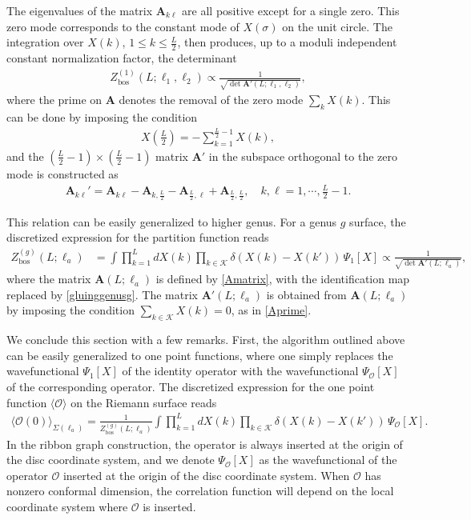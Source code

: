 \documentclass[12pt]{article}
\def\ie{\begin{equation}\begin{aligned}}
\def\fe{\end{aligned}\end{equation}}
\numberwithin{equation}{section}
\begin{document}
The eigenvalues of the matrix $\mathbf{A}_{k\ell}$ are all positive except for a single zero. This zero mode corresponds to the constant mode of $X(\sigma)$ on the unit circle. The integration over $X(k)$, $1\leq k\leq \frac{L}{2}$, then produces, up to a moduli independent constant normalization factor, the determinant
\ie\label{detprime}
Z_{\text{bos}}^{(1)}(L;\ell_1, \ell_2) \propto \frac{1}{\sqrt{\det \mathbf{A}'(L;\ell_1, \ell_2)}},
\fe
where the prime on $\mathbf{A}$ denotes the removal of the zero mode $\sum_k X(k)$. This can be done by imposing the condition
\ie X(\tfrac{L}{2})=-\sum_{k=1}^{\tfrac{L}{2}-1}X(k),
\fe 
and the $(\tfrac{L}{2}-1)\times (\tfrac{L}{2}-1)$ matrix $\mathbf{A}'$ in the subspace orthogonal to the zero mode is constructed as
\ie\label{Aprime}
\mathbf{A}_{k\ell}'= \mathbf{A}_{k\ell}-\mathbf{A}_{k,\frac{L}{2}}-\mathbf{A}_{\frac{L}{2},\ell}+\mathbf{A}_{\frac{L}{2}, \frac{L}{2}},\quad k,\ell = 1,\cdots, \tfrac{L}{2}-1.
\fe

This relation can be easily generalized to higher genus. For a genus $g$ surface, the discretized expression for the partition function reads
\ie \label{detprimeg}
Z_{\text{bos}}^{(g)}(L;\ell_a) &=\int \prod_{k=1}^{L} dX(k)\prod_{k\in \mathcal{K}} \delta(X(k)-X(k'))\,\Psi_1[X]\propto \frac{1}{\sqrt{\det \mathbf{A}'(L;\ell_a)}},
\fe
where the matrix $\mathbf{A}(L;\ell_a)$ is defined by \eqref{Amatrix}, with the identification map replaced by \eqref{gluinggenusg}. The matrix $\mathbf{A}'(L;\ell_a)$ is obtained from $\mathbf{A}(L;\ell_a)$ by imposing the condition $\sum_{k\in\mathcal{K}}X(k)=0$, as in \eqref{Aprime}.

We conclude this section with a few remarks. First, the algorithm outlined above can be easily generalized to one point functions, where one simply replaces the wavefunctional $\Psi_1[X]$ of the identity operator with the wavefunctional $\Psi_\mathcal{O}[X]$ of the corresponding operator. The discretized expression for the one point function $\langle \mathcal{O}\rangle$ on the Riemann surface reads
\ie \label{1ptfuncgeneral}
\langle \mathcal{O}(0)\rangle_{\Sigma(\ell_a)}= \frac{1}{Z_{\text{bos}}^{(g)}(L;\ell_a)}\int \prod_{k=1}^{L} dX(k)\prod_{k\in \mathcal{K}} \delta(X(k)-X(k'))\,\Psi_\mathcal{O}[X].
\fe
In the ribbon graph construction, the operator is always inserted at the origin of the disc coordinate system, and we denote $\Psi_{\mathcal{O}}[X]$ as the wavefunctional of the operator $\mathcal{O}$ inserted at the origin of the disc coordinate system. When $\mathcal{O}$ has nonzero conformal dimension, the correlation function will depend on the local coordinate system where $\mathcal{O}$ is inserted.
\end{document}
